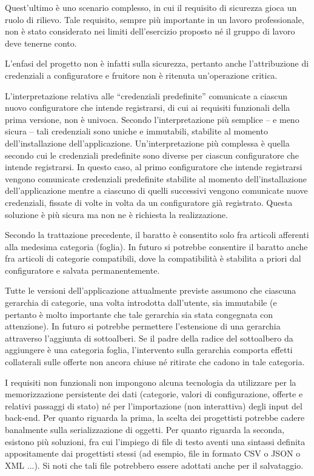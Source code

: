 Quest’ultimo è uno scenario complesso, in cui il requisito di sicurezza gioca un ruolo di rilievo. Tale requisito, sempre più importante in un lavoro professionale, non è stato considerato nei limiti dell’esercizio proposto né il gruppo di lavoro deve tenerne conto. 

L’enfasi del progetto non è infatti sulla sicurezza, pertanto anche l’attribuzione di credenziali a configuratore e fruitore non è ritenuta un’operazione critica. \newline

L’interpretazione relativa alle “credenziali predefinite” comunicate a ciascun nuovo configuratore che intende registrarsi, di cui ai requisiti funzionali della prima versione, non è univoca. 
Secondo l’interpretazione più semplice – e meno sicura – tali credenziali sono uniche e immutabili, stabilite al momento dell’installazione dell’applicazione. 
Un’interpretazione più complessa è quella secondo cui le credenziali predefinite sono diverse per ciascun configuratore che intende registrarsi. 
In questo caso, al primo configuratore che intende registrarsi vengono comunicate credenziali predefinite stabilite al momento dell’installazione dell’applicazione mentre a ciascuno di quelli successivi vengono comunicate nuove credenziali, fissate di volte in volta da un configuratore già registrato. Questa soluzione è più sicura ma non ne è richiesta la realizzazione.\newline

Secondo la trattazione precedente, il baratto è consentito solo fra articoli afferenti alla medesima categoria (foglia). 
In futuro si potrebbe consentire il baratto anche fra articoli di categorie compatibili, dove la compatibilità è stabilita a priori dal configuratore e salvata permanentemente.\newline

Tutte le versioni dell’applicazione attualmente previste assumono che ciascuna gerarchia di categorie, una volta introdotta dall’utente, sia immutabile (e pertanto è molto importante che tale gerarchia sia stata congegnata con attenzione). 
In futuro si potrebbe permettere l’estensione di una gerarchia attraverso l’aggiunta di sottoalberi. 
Se il padre della radice del sottoalbero da aggiungere è una categoria foglia, l’intervento sulla gerarchia comporta effetti collaterali sulle offerte non ancora chiuse né ritirate che cadono in tale categoria. \newline

I requisiti non funzionali non impongono alcuna tecnologia da utilizzare per la memorizzazione persistente dei dati (categorie, valori di configurazione, offerte e relativi passaggi di stato) né per l’importazione (non interattiva) degli input del back-end. 
Per quanto riguarda la prima, la scelta dei progettisti potrebbe cadere banalmente sulla serializzazione di oggetti. 
Per quanto riguarda la seconda, esistono più soluzioni, fra cui l’impiego di file di testo aventi una sintassi definita appositamente dai progettisti stessi (ad esempio, file in formato CSV o JSON o XML ...). Si noti che tali file potrebbero essere adottati anche per il salvataggio.\newline


